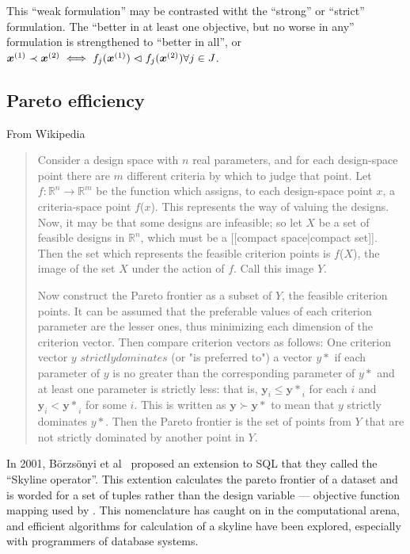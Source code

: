 This ``weak formulation'' may be contrasted witht the ``strong'' or ``strict'' formulation.
The ``better in at least one objective, but no worse in any'' formulation is strengthened to ``better in all'', or $\boldsymbol{x}^{(1)} \prec \boldsymbol{x}^{(2)} \iff f_j(\boldsymbol{x}^{(1)}) \vartriangleleft f_j(\boldsymbol{x}^{(2)}) \forall j \in J$.

\subsection{Pareto efficiency}
From Wikipedia
\begin{quote}
  Consider a design space with $n$ real parameters, and for each design-space point there are $m$ different criteria by which to judge that point.
  Let $f : \mathbb{R}^n \rightarrow \mathbb{R}^m$ be the function which assigns, to each design-space point $x$, a criteria-space point $f$($x$).
  This represents the way of valuing the designs.
  Now, it may be that some designs are infeasible; so let $X$ be a set of feasible designs in ${\mathbb{R}}^n$, which must be a [[compact space|compact set]].
  Then the set which represents the feasible criterion points is $f$($X$), the image of the set $X$ under the action of $f$.
  Call this image $Y$.

  Now construct the Pareto frontier as a subset of $Y$, the feasible criterion points.
  It can be assumed that the preferable values of each criterion parameter are the lesser ones, thus minimizing each dimension of the criterion vector. Then compare criterion vectors as follows:
  One criterion vector $y$ $strictly dominates$ (or "is preferred to") a vector $y*$ if each parameter of $y$ is no greater than the corresponding parameter of $y*$ and at least one parameter is strictly less: that is, $\mathbf{y}_i \le \mathbf{y*}_i$ for each $i$ and $\mathbf{y}_i < \mathbf{y*}_i$ for some $i$.
This is written as $\mathbf{y} \succ \mathbf{y*}$ to mean that $y$ strictly dominates $y*$.
Then the Pareto frontier is the set of points from $Y$ that are not strictly dominated by another point in $Y$.
\end{quote}

In 2001, B\"orzs\"onyi et al \citehere\ proposed an extension to SQL that they called the ``Skyline operator''.
This extention calculates the pareto frontier of a dataset and is worded for a set of tuples rather than the design variable --- objective function mapping used by \citet{deb.kalyanmoy2001multi-objective}.
This nomenclature has caught on in the computational arena, and efficient algorithms for calculation of a skyline have been explored, especially with
programmers of database systems.

